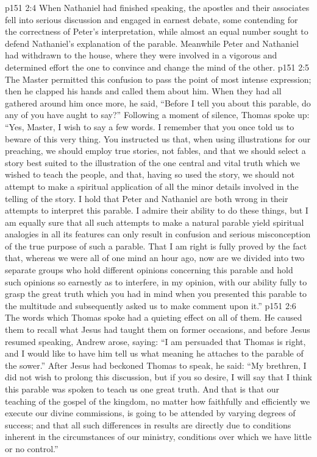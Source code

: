 \vs p151 2:4 When Nathaniel had finished speaking, the apostles and their associates fell into serious discussion and engaged in earnest debate, some contending for the correctness of Peter’s interpretation, while almost an equal number sought to defend Nathaniel’s explanation of the parable. Meanwhile Peter and Nathaniel had withdrawn to the house, where they were involved in a vigorous and determined effort the one to convince and change the mind of the other.
\vs p151 2:5 The Master permitted this confusion to pass the point of most intense expression; then he clapped his hands and called them about him. When they had all gathered around him once more, he said, \textcolor{ubdarkred}{“Before I tell you about this parable, do any of you have aught to say?”} Following a moment of silence, Thomas spoke up: “Yes, Master, I wish to say a few words. I remember that you once told us to beware of this very thing. You instructed us that, when using illustrations for our preaching, we should employ true stories, not fables, and that we should select a story best suited to the illustration of the one central and vital truth which we wished to teach the people, and that, having so used the story, we should not attempt to make a spiritual application of all the minor details involved in the telling of the story. I hold that Peter and Nathaniel are both wrong in their attempts to interpret this parable. I admire their ability to do these things, but I am equally sure that all such attempts to make a natural parable yield spiritual analogies in all its features can only result in confusion and serious misconception of the true purpose of such a parable. That I am right is fully proved by the fact that, whereas we were all of one mind an hour ago, now are we divided into two separate groups who hold different opinions concerning this parable and hold such opinions so earnestly as to interfere, in my opinion, with our ability fully to grasp the great truth which you had in mind when you presented this parable to the multitude and subsequently asked us to make comment upon it.”
\vs p151 2:6 The words which Thomas spoke had a quieting effect on all of them. He caused them to recall what Jesus had taught them on former occasions, and before Jesus resumed speaking, Andrew arose, saying: “I am persuaded that Thomas is right, and I would like to have him tell us what meaning he attaches to the parable of the sower.” After Jesus had beckoned Thomas to speak, he said: “My brethren, I did not wish to prolong this discussion, but if you so desire, I will say that I think this parable was spoken to teach us one great truth. And that is that our teaching of the gospel of the kingdom, no matter how faithfully and efficiently we execute our divine commissions, is going to be attended by varying degrees of success; and that all such differences in results are directly due to conditions inherent in the circumstances of our ministry, conditions over which we have little or no control.”

